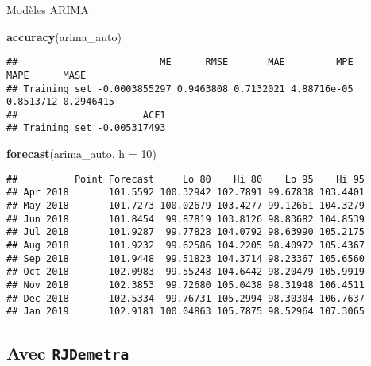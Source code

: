 \documentclass[10pt,xcolor=table,color={dvipsnames,usenames},ignorenonframetext,usepdftitle=false,french]{beamer}
\newenvironment{Shaded}{\begin{snugshade}}{\end{snugshade}}
\newcommand{\DataTypeTok}[1]{\textcolor[rgb]{0.13,0.29,0.53}{#1}}
\newcommand{\DecValTok}[1]{\textcolor[rgb]{0.00,0.00,0.81}{#1}}
\newcommand{\KeywordTok}[1]{\textcolor[rgb]{0.13,0.29,0.53}{\textbf{#1}}}
\newcommand{\NormalTok}[1]{#1}
\begin{document}
\begin{frame}[fragile]{Modèles ARIMA}
\protect\hypertarget{moduxe8les-arima-1}{}

\begin{Shaded}
\begin{Highlighting}[]
\KeywordTok{accuracy}\NormalTok{(arima_auto)}
\end{Highlighting}
\end{Shaded}

\begin{verbatim}
##                         ME      RMSE       MAE         MPE      MAPE      MASE
## Training set -0.0003855297 0.9463808 0.7132021 4.88716e-05 0.8513712 0.2946415
##                      ACF1
## Training set -0.005317493
\end{verbatim}

\begin{Shaded}
\begin{Highlighting}[]
\KeywordTok{forecast}\NormalTok{(arima_auto, }\DataTypeTok{h =} \DecValTok{10}\NormalTok{)}
\end{Highlighting}
\end{Shaded}

\begin{verbatim}
##          Point Forecast     Lo 80    Hi 80    Lo 95    Hi 95
## Apr 2018       101.5592 100.32942 102.7891 99.67838 103.4401
## May 2018       101.7273 100.02679 103.4277 99.12661 104.3279
## Jun 2018       101.8454  99.87819 103.8126 98.83682 104.8539
## Jul 2018       101.9287  99.77828 104.0792 98.63990 105.2175
## Aug 2018       101.9232  99.62586 104.2205 98.40972 105.4367
## Sep 2018       101.9448  99.51823 104.3714 98.23367 105.6560
## Oct 2018       102.0983  99.55248 104.6442 98.20479 105.9919
## Nov 2018       102.3853  99.72680 105.0438 98.31948 106.4511
## Dec 2018       102.5334  99.76731 105.2994 98.30304 106.7637
## Jan 2019       102.9181 100.04863 105.7875 98.52964 107.3065
\end{verbatim}

\end{frame}

\hypertarget{avec-rjdemetra}{%
\subsection{\texorpdfstring{Avec
\texttt{RJDemetra}}{Avec RJDemetra}}\label{avec-rjdemetra}}
\end{document}
